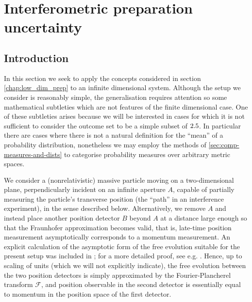 \chapter{Interferometric preparation uncertainty}\label{chap:interferometric_prep_ur}

\section{Introduction} 

In this section we seek to apply the concepts considered in section \ref{chap:low_dim_prep} to an infinite dimensional system. Although the setup we consider is reasonably simple, the generalisation requires attention so some mathematical subtleties which are not features of the finite dimensional case. One of these subtleties arises because we will be interested in cases for which it is not sufficient to consider the outcome set to be a simple subset of $2.5$. In particular there are cases where there is not a natural definition for the ``mean'' of a probability distribution, nonetheless we may employ the methods of \ref{sec:comp-measures-and-dists} to categorise probability measures over arbitrary metric spaces.

We consider a (nonrelativistic) massive particle moving on a two-dimensional plane, perpendicularly incident on an infinite aperture $A$, capable of partially measuring the particle's transverse position (the ``path'' in an interference experiment), in the sense described below. Alternatively, we remove $A$ and instead place another position detector $B$ beyond $A$ at a distance large 
enough so that the Fraunhofer approximation becomes valid, that is, late-time position measurement asymptotically corresponds to a momentum measurement. An explicit calculation of the asymptotic form of the free evolution suitable for the present setup was included in \cite{BB2013}; for a more detailed proof, see e.g. \cite[Theorem IX.31]{RSII}. Hence, up to scaling of units (which we will not explicitly indicate), the free evolution between the two position detectors is simply approximated by the Fourier-Plancherel transform $\mathcal F$, and position observable in the second detector is essentially equal to momentum in the position space of the first detector.

